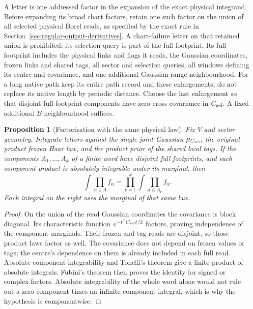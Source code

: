 \documentclass[11pt,reqno]{amsart}
\numberwithin{equation}{section}
\newtheorem{proposition}[theorem]{Proposition}
\theoremstyle{definition}
\theoremstyle{remark}
\begin{document}
A letter is one addressed factor in the expansion of the exact
physical integrand. Before expanding its broad chart factors,
retain one such factor on the union of all selected physical
Borel reads, as specified by the exact rule in
Section~\ref{sec:regular-output-derivatives}. A chart-failure
letter on that retained union is prohibited; its selection
query is part of the full footprint. Its full footprint includes the physical
links and flags it reads, the Gaussian coordinates, frozen links
and shared tags, all sector and selection queries, all windows
defining its centre and covariance, and one additional Gaussian
range neighbourhood. For a long native path keep its entire path
record and these enlargements; do not replace its native length
by periodic distance.
Choose the last enlargement so that disjoint full-footprint
components have zero cross covariance in \(C_{\rm sel}\).
A fixed additional \(B\)-neighbourhood suffices.

\begin{proposition}[Factorisation with the same physical law]
\label{prop:reassembly-component-factorisation}
Fix \(V\) and sector geometry. Integrate letters against the
single joint Gaussian \(\mu_{C_{\rm sel}}\), the original
product frozen Haar law, and the product prior of the shared
local tags. If the components \(A_1,\ldots,A_k\) of a finite
word have disjoint full footprints, and each component product
is absolutely integrable under its marginal, then
\begin{equation}
          \int\prod_{\alpha\in A}f_\alpha
                    =\prod_{\nu=1}^k\int\prod_{\alpha\in A_\nu}f_\alpha.
 \label{eq:reassembly-component-factorisation}
\end{equation}
Each integral on the right uses the marginal of that same law.
\end{proposition}
\begin{proof}
On the union of the read Gaussian coordinates the covariance is
block diagonal. Its characteristic function
\(e^{-t^{\mathsf T}C_{\rm sel}t/2}\) factors, proving independence of the
component marginals. Their frozen and tag reads are disjoint,
so those product laws factor as well. The covariance does not
depend on frozen values or tags; the centre's dependence on
them is already included in each full read. Absolute component
integrability and Tonelli's theorem give a finite product of
absolute integrals. Fubini's theorem then proves the identity for
signed or complex factors. Absolute integrability of the whole
word alone would not rule out a zero component times an infinite
component integral, which is why the hypothesis is componentwise.
\end{proof}
\end{document}
